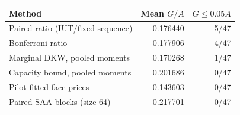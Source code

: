 \begin{tabular}{lrr}
\toprule
Method & Mean $G/A$ & $G\le0.05A$ \\
\midrule
Paired ratio (IUT/fixed sequence) & 0.176440 & 5/47 \\
Bonferroni ratio & 0.177906 & 4/47 \\
Marginal DKW, pooled moments & 0.170268 & 1/47 \\
Capacity bound, pooled moments & 0.201686 & 0/47 \\
Pilot-fitted face prices & 0.143603 & 0/47 \\
Paired SAA blocks (size 64) & 0.217701 & 0/47 \\
\bottomrule
\end{tabular}

